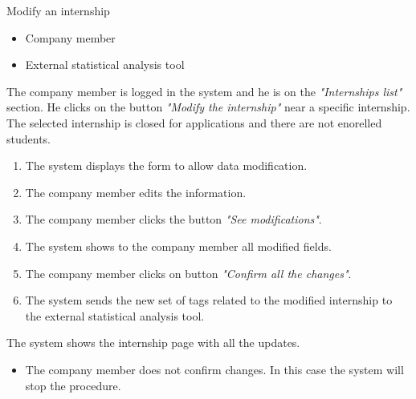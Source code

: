 \usecase
{Modify an internship}
{
    \begin{itemize}
        \item Company member
        \item External statistical analysis tool
    \end{itemize}
}
{
    The company member is logged in the system and he is on the \textit{"Internships list"} section. He clicks on the button \textit{"Modify the internship"} near a specific internship. The selected internship is closed for applications and there are not enorelled students.
}
{
    \begin{enumerate}
        \item The system displays the form to allow data modification.
        \item The company member edits the information.
        \item The company member clicks the button \textit{"See modifications"}.
        \item The system shows to the company member all modified fields.
        \item The company member clicks on button \textit{"Confirm all the changes"}.
        \item The system sends the new set of tags related to the modified internship to the external statistical analysis tool.
        \end{enumerate}
}
{
    The system shows the internship page with all the updates.
}
{
    \begin{itemize}
        \item The company member does not confirm changes. In this case the system will stop the procedure.
    \end{itemize}
}
{

}

